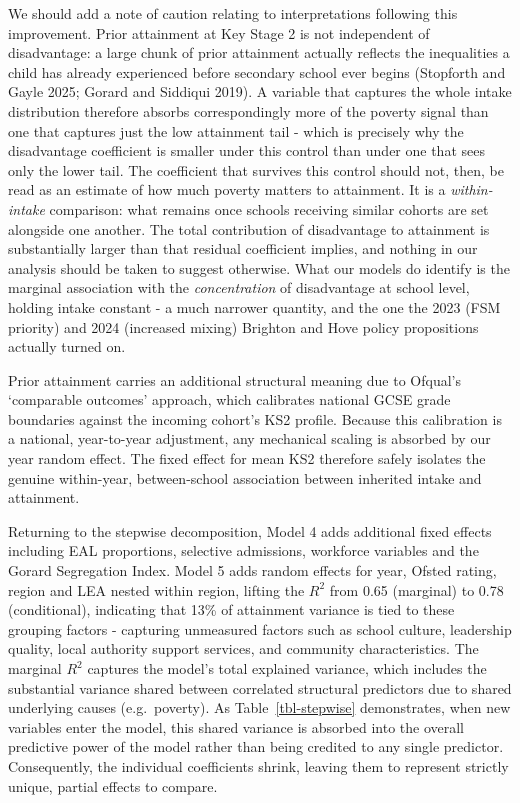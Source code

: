 \documentclass[
  12pt,
  titlepage]{article}
\begin{document}
We should add a note of caution relating to interpretations following
this improvement. Prior attainment at Key Stage 2 is not independent of
disadvantage: a large chunk of prior attainment actually reflects the
inequalities a child has already experienced before secondary school
ever begins (Stopforth and Gayle 2025; Gorard and Siddiqui 2019). A
variable that captures the whole intake distribution therefore absorbs
correspondingly more of the poverty signal than one that captures just
the low attainment tail - which is precisely why the disadvantage
coefficient is smaller under this control than under one that sees only
the lower tail. The coefficient that survives this control should not,
then, be read as an estimate of how much poverty matters to attainment.
It is a \emph{within-intake} comparison: what remains once schools
receiving similar cohorts are set alongside one another. The total
contribution of disadvantage to attainment is substantially larger than
that residual coefficient implies, and nothing in our analysis should be
taken to suggest otherwise. What our models do identify is the marginal
association with the \emph{concentration} of disadvantage at school
level, holding intake constant - a much narrower quantity, and the one
the 2023 (FSM priority) and 2024 (increased mixing) Brighton and Hove
policy propositions actually turned on.

Prior attainment carries an additional structural meaning due to
Ofqual's `comparable outcomes' approach, which calibrates national GCSE
grade boundaries against the incoming cohort's KS2 profile. Because this
calibration is a national, year-to-year adjustment, any mechanical
scaling is absorbed by our year random effect. The fixed effect for mean
KS2 therefore safely isolates the genuine within-year, between-school
association between inherited intake and attainment.

Returning to the stepwise decomposition, Model 4 adds additional fixed
effects including EAL proportions, selective admissions, workforce
variables and the Gorard Segregation Index. Model 5 adds random effects
for year, Ofsted rating, region and LEA nested within region, lifting
the \(R^2\) from 0.65 (marginal) to 0.78 (conditional), indicating that
13\% of attainment variance is tied to these grouping factors -
capturing unmeasured factors such as school culture, leadership quality,
local authority support services, and community characteristics. The
marginal \(R^2\) captures the model's total explained variance, which
includes the substantial variance shared between correlated structural
predictors due to shared underlying causes (e.g.~poverty). As
Table~\ref{tbl-stepwise} demonstrates, when new variables enter the
model, this shared variance is absorbed into the overall predictive
power of the model rather than being credited to any single predictor.
Consequently, the individual coefficients shrink, leaving them to
represent strictly unique, partial effects to compare.
\end{document}
